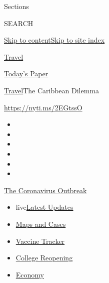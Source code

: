Sections

SEARCH

\protect\hyperlink{site-content}{Skip to
content}\protect\hyperlink{site-index}{Skip to site index}

\href{https://www.nytimes.com/section/travel}{Travel}

\href{https://myaccount.nytimes.com/auth/login?response_type=cookie\&client_id=vi}{}

\href{https://www.nytimes.com/section/todayspaper}{Today's Paper}

\href{/section/travel}{Travel}\textbar{}The Caribbean Dilemma

\url{https://nyti.ms/2EGtssO}

\begin{itemize}
\item
\item
\item
\item
\item
\item
\end{itemize}

\href{https://www.nytimes.com/news-event/coronavirus?action=click\&pgtype=Article\&state=default\&region=TOP_BANNER\&context=storylines_menu}{The
Coronavirus Outbreak}

\begin{itemize}
\tightlist
\item
  live\href{https://www.nytimes.com/2020/08/04/world/coronavirus-cases.html?action=click\&pgtype=Article\&state=default\&region=TOP_BANNER\&context=storylines_menu}{Latest
  Updates}
\item
  \href{https://www.nytimes.com/interactive/2020/us/coronavirus-us-cases.html?action=click\&pgtype=Article\&state=default\&region=TOP_BANNER\&context=storylines_menu}{Maps
  and Cases}
\item
  \href{https://www.nytimes.com/interactive/2020/science/coronavirus-vaccine-tracker.html?action=click\&pgtype=Article\&state=default\&region=TOP_BANNER\&context=storylines_menu}{Vaccine
  Tracker}
\item
  \href{https://www.nytimes.com/2020/08/02/us/covid-college-reopening.html?action=click\&pgtype=Article\&state=default\&region=TOP_BANNER\&context=storylines_menu}{College
  Reopening}
\item
  \href{https://www.nytimes.com/live/2020/08/04/business/stock-market-today-coronavirus?action=click\&pgtype=Article\&state=default\&region=TOP_BANNER\&context=storylines_menu}{Economy}
\end{itemize}


